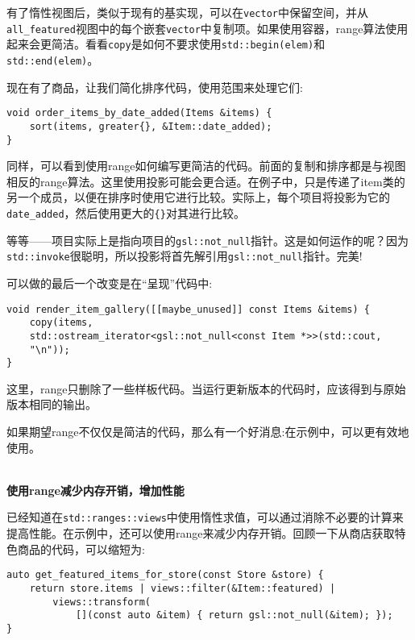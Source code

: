 有了惰性视图后，类似于现有的基实现，可以在\texttt{vector}中保留空间，并从\texttt{all\_featured}视图中的每个嵌套\texttt{vector}中复制项。如果使用容器，range算法使用起来会更简洁。看看\texttt{copy}是如何不要求使用\texttt{std::begin(elem)}和\texttt{std::end(elem)}。

现在有了商品，让我们简化排序代码，使用范围来处理它们:

\begin{lstlisting}[style=styleCXX]
void order_items_by_date_added(Items &items) {
	sort(items, greater{}, &Item::date_added);
}
\end{lstlisting}

同样，可以看到使用range如何编写更简洁的代码。前面的复制和排序都是与视图相反的range算法。这里使用投影可能会更合适。在例子中，只是传递了item类的另一个成员，以便在排序时使用它进行比较。实际上，每个项目将投影为它的\texttt{date\_added}，然后使用更大的\texttt{\{\}}对其进行比较。

等等——项目实际上是指向项目的\texttt{gsl::not\_null}指针。这是如何运作的呢？因为\texttt{std::invoke}很聪明，所以投影将首先解引用\texttt{gsl::not\_null}指针。完美!

可以做的最后一个改变是在“呈现”代码中:

\begin{lstlisting}[style=styleCXX]
void render_item_gallery([[maybe_unused]] const Items &items) {
	copy(items,
	std::ostream_iterator<gsl::not_null<const Item *>>(std::cout,
	"\n"));
}
\end{lstlisting}

这里，range只删除了一些样板代码。当运行更新版本的代码时，应该得到与原始版本相同的输出。

如果期望range不仅仅是简洁的代码，那么有一个好消息:在示例中，可以更有效地使用。

\hspace*{\fill} \\ %
\noindent
\textbf{使用range减少内存开销，增加性能}

已经知道在\texttt{std::ranges::views}中使用惰性求值，可以通过消除不必要的计算来提高性能。在示例中，还可以使用range来减少内存开销。回顾一下从商店获取特色商品的代码，可以缩短为:

\begin{lstlisting}[style=styleCXX]
auto get_featured_items_for_store(const Store &store) {
	return store.items | views::filter(&Item::featured) |
		views::transform(
			[](const auto &item) { return gsl::not_null(&item); });
}
\end{lstlisting}

